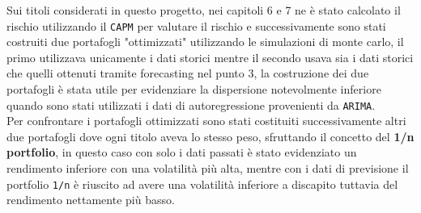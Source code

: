 Sui titoli considerati in questo progetto, nei capitoli 6 e 7 ne è stato calcolato il rischio utilizzando il \verb|CAPM| per valutare il rischio e successivamente sono stati costruiti due portafogli "ottimizzati"
utilizzando le simulazioni di monte carlo, il primo utilizzava unicamente i dati storici mentre il secondo usava sia i dati storici che quelli ottenuti tramite forecasting nel punto 3,
la costruzione dei due portafogli è stata utile per evidenziare la dispersione notevolmente inferiore quando sono stati utilizzati i dati di autoregressione provenienti da \verb|ARIMA|.\\
Per confrontare i portafogli ottimizzati sono stati costituiti successivamente altri due portafogli dove ogni titolo aveva lo stesso peso, sfruttando il concetto del \textbf{1/n portfolio}, in questo
caso con solo i dati passati è stato evidenziato un rendimento inferiore con una volatilità più alta, mentre con i dati di previsione il portfolio \verb|1/n| è riuscito ad avere una volatilità inferiore a discapito tuttavia
del rendimento nettamente più basso.